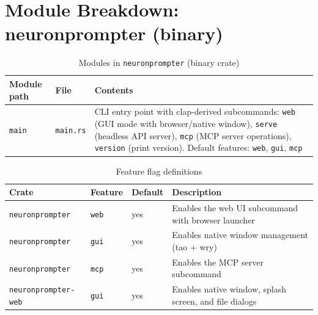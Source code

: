 \documentclass[a4paper, 11pt, oneside]{report}
\begin{document}
\section{Module Breakdown: neuronprompter (binary)}
\label{sec:mod-bin}

\begin{table}[H]
  \centering
  \caption{Modules in \texttt{neuronprompter} (binary crate)}
  \label{tab:mod-bin}
  \begin{tabularx}{\textwidth}{l l X}
    \toprule
    \textbf{Module path} & \textbf{File} & \textbf{Contents} \\
    \midrule
    \texttt{main}               & \texttt{main.rs}           & CLI entry point with clap-derived subcommands:
                                                               \texttt{web} (GUI mode with browser/native
                                                               window), \texttt{serve} (headless API server),
                                                               \texttt{mcp} (MCP server operations),
                                                               \texttt{version} (print version).
                                                               Default features: \texttt{web}, \texttt{gui},
                                                               \texttt{mcp} \\
    \bottomrule
  \end{tabularx}
\end{table}

\begin{table}[H]
  \centering
  \caption{Feature flag definitions}
  \label{tab:features}
  \begin{tabularx}{\textwidth}{l l l X}
    \toprule
    \textbf{Crate} & \textbf{Feature} & \textbf{Default} & \textbf{Description} \\
    \midrule
    \texttt{neuronprompter} & \texttt{web} & yes & Enables the web UI subcommand with browser launcher \\
    \texttt{neuronprompter} & \texttt{gui} & yes & Enables native window management (tao + wry) \\
    \texttt{neuronprompter} & \texttt{mcp} & yes & Enables the MCP server subcommand \\
    \texttt{neuronprompter-web} & \texttt{gui} & yes & Enables native window, splash screen, and file dialogs \\
    \bottomrule
  \end{tabularx}
\end{table}
\end{document}
